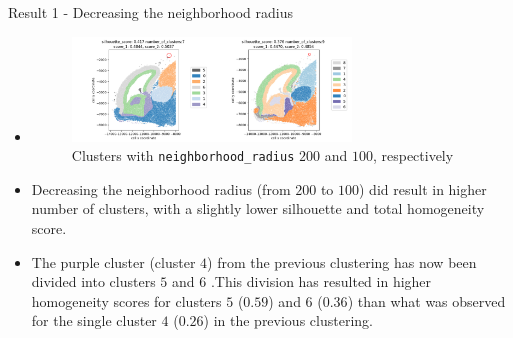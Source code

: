 \documentclass{beamer}
\begin{document}
\begin{frame}{Result 1 - Decreasing the neighborhood radius}

\begin{itemize}
    \item<1-> []
    	\begin{figure}
   		 \includegraphics[width=0.7\textwidth]{clusters_1_3.png}
   		 \caption{Clusters with \texttt{neighborhood\_radius} $200$ and $100$, respectively}
	\end{figure} 
    \item<2-> Decreasing the neighborhood radius (from $200$ to $100$) did result in higher number of clusters, with a slightly lower silhouette and total homogeneity score. 
    \item <3-> The purple cluster (cluster $4$) from the previous clustering has now been divided into clusters $5$ and $6$ .This division has resulted in higher homogeneity scores for clusters $5$ ($0.59$) and $6$ ($0.36$) than what was observed for the single cluster $4$ ($0.26$) in the previous clustering. 
\end{itemize}

\end{frame}
\end{document}

